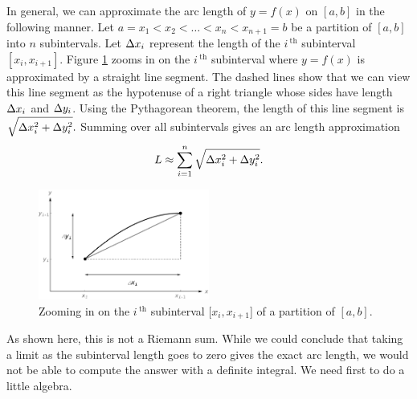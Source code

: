 In general,  we can approximate the arc length of $y=f(x)$ on $[a,b]$ in the following manner. Let $a=x_1 < x_2 < \ldots < x_n< x_{n+1}=b$ be a partition of $[a,b]$ into $n$ subintervals. Let $\Delta x_i$ represent the length of the $i\,^\text{th}$ subinterval $[x_i,x_{i+1}]$. Figure \ref{fig_int_app_22} zooms in on the $i\,^\text{th}$ subinterval where $y=f(x)$ is approximated by a straight line segment. The dashed lines show that we can view this line segment as the hypotenuse of a right triangle whose sides have length $\Delta x_i$ and $\Delta y_i$. Using the Pythagorean theorem, the length of this line segment is
$\displaystyle \sqrt{\Delta x_i^2 + \Delta y_i^2}.$ Summing over all subintervals gives an arc length approximation
$$L \approx \sum_{i=1}^n \sqrt{\Delta x_i^2 + \Delta y_i^2}.$$


\begin{figure}
	\begin{center}
			\includegraphics[width=0.5\textwidth]{fig_int_app_22}
	\caption{Zooming in on the $i\,^\text{th}$ subinterval $[x_i,x_{i+1}$] of a partition of $[a,b]$.}
	\label{fig_int_app_22}
	\end{center}
\end{figure}


As shown here, this is not a Riemann sum. While we could conclude that taking a limit as the subinterval length goes to zero gives the exact arc length, we would not be able to compute the answer with a definite integral. We need first to do a little algebra.

